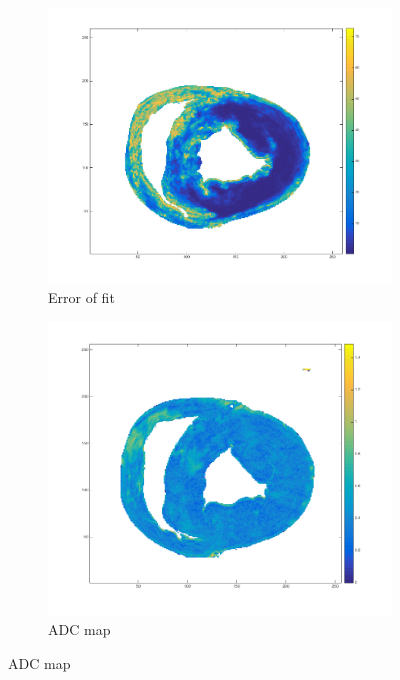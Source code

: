 \begin{figure}
    \centering
    \begin{subfigure}{.31\textwidth}
        \includegraphics[width=\textwidth]{figures/pig4_err_21}
        \caption{Error of fit}
        \label{fig:pig4_err}
    \end{subfigure}
    \begin{subfigure}{.31\textwidth}
        \includegraphics[width=\textwidth]{figures/pig4_adc_21}
        \caption{ADC map}
        \label{fig:pig4_adc}
    \end{subfigure}

\end{figure}
